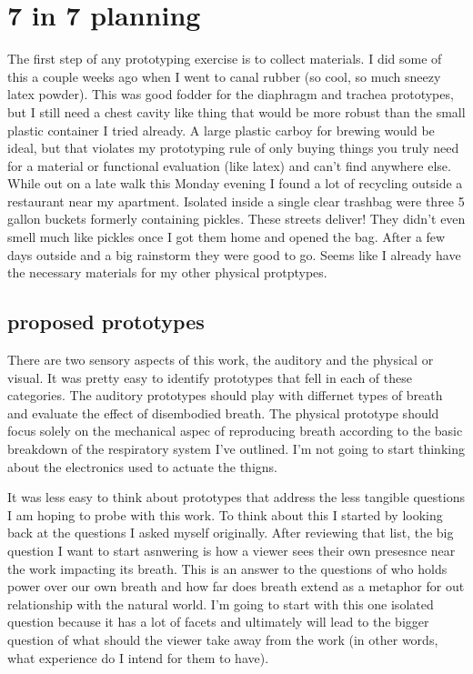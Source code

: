 \documentclass[11pt]{report}
\begin{document}
\clearpage
\section*{7 in 7 planning}

The first step of any prototyping exercise is to collect materials. I did some of this a couple weeks ago when I went to canal rubber (so cool, so much sneezy latex powder). This was good fodder for the diaphragm and trachea prototypes, but I still need a chest cavity like thing that would be more robust than the small plastic container I tried already. A large plastic carboy for brewing would be ideal, but that violates my prototyping rule of only buying things you truly need for a material or functional evaluation (like latex) and can't find anywhere else. While out on a late walk this Monday evening I found a lot of recycling outside a restaurant near my apartment. Isolated inside a single clear trashbag were three 5 gallon buckets formerly containing pickles. These streets deliver! They didn't even smell much like pickles once I got them home and opened the bag. After a few days outside and a big rainstorm they were good to go. Seems like I already have the necessary materials for my other physical protptypes. 

\subsection*{proposed prototypes}

There are two sensory aspects of this work, the auditory and the physical or visual. It was pretty easy to identify prototypes that fell in each of these categories. The auditory prototypes should play with differnet types of breath and evaluate the effect of disembodied breath. The physical prototype should focus solely on the mechanical aspec of reproducing breath according to the basic breakdown of the respiratory system I've outlined. I'm not going to start thinking about the electronics used to actuate the thigns.

It was less easy to think about prototypes that address the less tangible questions I am hoping to probe with this work. To think about this I started by looking back at the questions I asked myself originally. After reviewing that list, the big question I want to start asnwering is how a viewer sees their own presesnce near the work impacting its breath. This is an answer to the questions of who holds power over our own breath and how far does breath extend as a metaphor for out relationship with the natural world. I'm going to start with this one isolated question because it has a lot of facets and ultimately will lead to the bigger question of what should the viewer take away from the work (in other words, what experience do I intend for them to have). 
\end{document}
